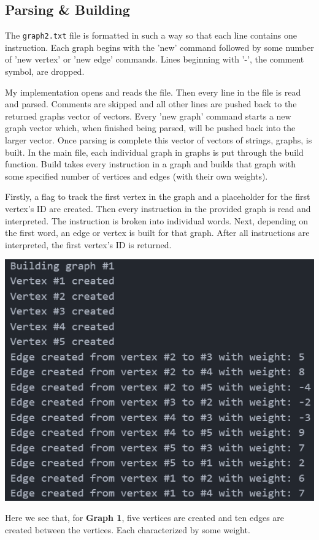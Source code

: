 \documentclass[12pt, letterpaper]{article}
\begin{document}
\subsection{Parsing \& Building} \label{Graph_ParseBuild}
The \texttt{graph2.txt} file is formatted in such a way so that each line contains one instruction.
Each graph begins with the 'new' command followed by some number of 'new vertex' or 'new edge' commands.
Lines beginning with '-', the comment symbol, are dropped.
\begin{center}
   
\end{center}
My implementation opens and reads the file.
Then every line in the file is read and parsed.
Comments are skipped and all other lines are pushed back to the returned graphs vector of vectors.
Every 'new graph' command starts a new graph vector which, when finished being parsed, will be pushed back into the larger vector.
\vspace*{5px}
\newline
Once parsing is complete this vector of vectors of strings, graphs, is built.
In the main file, each individual graph in graphs is put through the build function.
Build takes every instruction in a graph and builds that graph with some specified number of vertices and edges (with their own weights).
\begin{center}
   
\end{center}
Firstly, a flag to track the first vertex in the graph and a placeholder for the first vertex's ID are created.
Then every instruction in the provided graph is read and interpreted.
The instruction is broken into individual words.
Next, depending on the first word, an edge or vertex is built for that graph.
After all instructions are interpreted, the first vertex's ID is returned.
\begin{center}
   \includegraphics{images/Graph1_ParseBuild.png}
\end{center}
Here we see that, for \textbf{Graph 1}, five vertices are created and ten edges are created between the vertices.
Each characterized by some weight.
\end{document}
